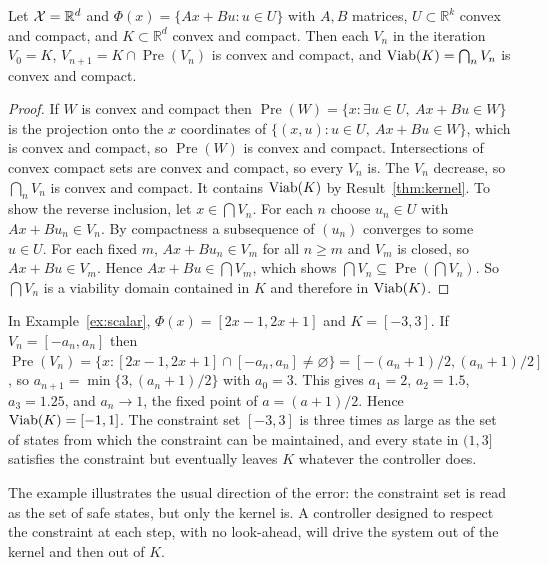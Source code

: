\begin{established}\label{thm:convex-kernel}
Let $\mathcal{X}=\mathbb R^{d}$ and $\Phi(x)=\{Ax+Bu:u\in U\}$ with $A,B$ matrices, $U\subset\mathbb R^{k}$ convex and compact, and $K\subset\mathbb R^{d}$ convex and compact. Then each $V_n$ in the iteration $V_0=K$, $V_{n+1}=K\cap\operatorname{Pre}(V_n)$ is convex and compact, and $\operatorname{Viab}(K)=\bigcap_nV_n$ is convex and compact.
\end{established}
\begin{proof}
If $W$ is convex and compact then $\operatorname{Pre}(W)=\{x:\exists u\in U,\ Ax+Bu\in W\}$ is the projection onto the $x$ coordinates of $\{(x,u):u\in U,\ Ax+Bu\in W\}$, which is convex and compact, so $\operatorname{Pre}(W)$ is convex and compact. Intersections of convex compact sets are convex and compact, so every $V_n$ is. The $V_n$ decrease, so $\bigcap_nV_n$ is convex and compact. It contains $\operatorname{Viab}(K)$ by Result~\ref{thm:kernel}. To show the reverse inclusion, let $x\in\bigcap V_n$. For each $n$ choose $u_n\in U$ with $Ax+Bu_n\in V_n$. By compactness a subsequence of $(u_n)$ converges to some $u\in U$. For each fixed $m$, $Ax+Bu_n\in V_m$ for all $n\ge m$ and $V_m$ is closed, so $Ax+Bu\in V_m$. Hence $Ax+Bu\in\bigcap V_m$, which shows $\bigcap V_n\subseteq\operatorname{Pre}(\bigcap V_n)$. So $\bigcap V_n$ is a viability domain contained in $K$ and therefore in $\operatorname{Viab}(K)$.
\end{proof}

\begin{example}\label{ex:scalar-kernel}
In Example~\ref{ex:scalar}, $\Phi(x)=[2x-1,2x+1]$ and $K=[-3,3]$. If $V_n=[-a_n,a_n]$ then $\operatorname{Pre}(V_n)=\{x:[2x-1,2x+1]\cap[-a_n,a_n]\ne\varnothing\}=[-(a_n+1)/2,(a_n+1)/2]$, so $a_{n+1}=\min\{3,(a_n+1)/2\}$ with $a_0=3$. This gives $a_1=2$, $a_2=1.5$, $a_3=1.25$, and $a_n\to1$, the fixed point of $a=(a+1)/2$. Hence $\operatorname{Viab}(K)=[-1,1]$. The constraint set $[-3,3]$ is three times as large as the set of states from which the constraint can be maintained, and every state in $(1,3]$ satisfies the constraint but eventually leaves $K$ whatever the controller does.
\end{example}

The example illustrates the usual direction of the error: the constraint set is read as the set of safe states, but only the kernel is. A controller designed to respect the constraint at each step, with no look-ahead, will drive the system out of the kernel and then out of $K$.


